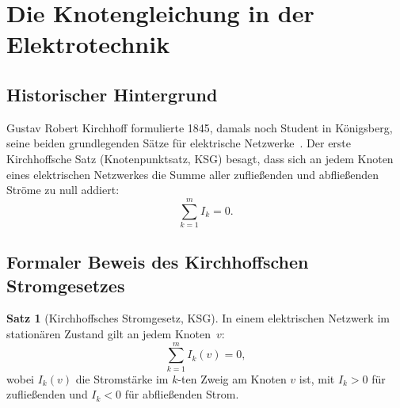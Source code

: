 ﻿\documentclass[a4paper,12pt]{article}
\theoremstyle{definition}
\newtheorem{satz}{Satz}
\begin{document}
\section{Die Knotengleichung in der Elektrotechnik}

\subsection{Historischer Hintergrund}

Gustav Robert Kirchhoff formulierte 1845, damals noch Student in Königsberg,
seine beiden grundlegenden Sätze für elektrische Netzwerke~\cite{kirchhoff1845}.
Der erste Kirchhoffsche Satz (Knotenpunktsatz, KSG) besagt, dass sich an
jedem Knoten eines elektrischen Netzwerkes die Summe aller zufließenden
und abfließenden Ströme zu null addiert:
\[
  \sum_{k=1}^{m} I_k = 0.
\]

\subsection{Formaler Beweis des Kirchhoffschen Stromgesetzes}

\begin{satz}[Kirchhoffsches Stromgesetz, KSG]
  \label{satz:ksg}
  In einem elektrischen Netzwerk im stationären Zustand gilt an jedem
  Knoten~$v$:
  \[
    \sum_{k=1}^{m} I_k(v) = 0,
  \]
  wobei $I_k(v)$ die Stromstärke im $k$-ten Zweig am Knoten $v$ ist,
  mit $I_k > 0$ für zufließenden und $I_k < 0$ für abfließenden Strom.
\end{satz}
\end{document}
